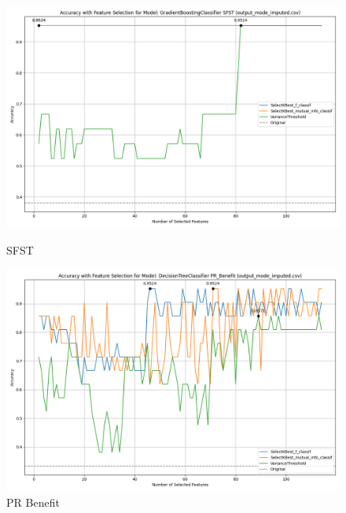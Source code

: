 \begin{figure}[H]
    \centering
    \begin{minipage}[b]{0.45\textwidth}
        \includegraphics[width=\textwidth]{class_all_section/images_class_ensemble_reduction/feature_selection_accuracy_plot_output_mode_imputedcsv_GradientBoostingClassifier_SFST.png}
        \caption{SFST}
        \label{fig_class_all:sfst_featred_graph}
    \end{minipage}
    \hfill
    \begin{minipage}[b]{0.45\textwidth}
        \includegraphics[width=\textwidth]{class_all_section/images_class_ensemble_reduction/feature_selection_accuracy_plot_output_mode_imputedcsv_DecisionTreeClassifier_PR_Benefit.png}
        \caption{PR Benefit}
        \label{fig_class_all:pr_ben_featred_graph}
    \end{minipage}
\end{figure}

